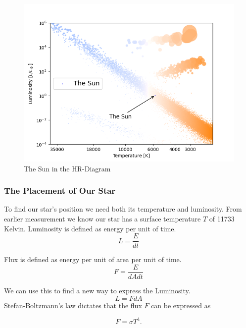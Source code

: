 \documentclass[reprint,english,notitlepage]{revtex4-2}
\begin{document}
\begin{figure}[h!]
  \centering
  \includegraphics[scale = .5]{figures/HR_diagram_The Sun}
  \caption{The Sun in the HR-Diagram}
  \label{fig: HR_diagram_The_Sun}
\end{figure}

\subsubsection*{The Placement of Our Star}
To find our star's position we need both its temperature and luminosity. From earlier measurement we know our star has a surface temperature $ T $ of 11733 Kelvin. Luminosity is defined as energy per unit of time. 
\begin{equation} \label{eq: Luminosity}
  L = \frac{E}{dt}
\end{equation}  

Flux is defined as energy per unit of area per unit of time. 
\begin{equation} \label{eq: Flux}
  F = \frac{E}{dAdt}
\end{equation}

We can use this to find a new way to express the Luminosity. 
\begin{equation} \label{eq: Lumin 2}
  L = FdA 
\end{equation}
Stefan-Boltzmann's law%
dictates that the flux $ F $ can be expressed as

\begin{equation}\label{eq: Flux 2}
  F = σT^{4}.
\end{equation}
\end{document}
